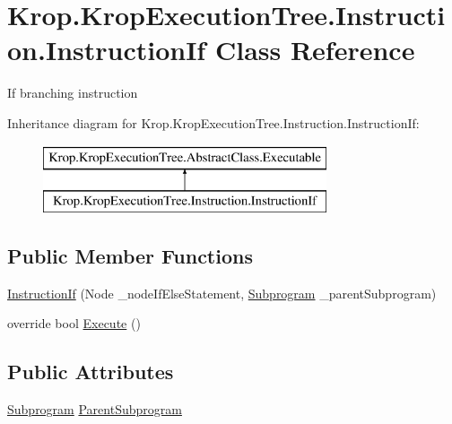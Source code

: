 \hypertarget{class_krop_1_1_krop_execution_tree_1_1_instruction_1_1_instruction_if}{}\section{Krop.\+Krop\+Execution\+Tree.\+Instruction.\+Instruction\+If Class Reference}
\label{class_krop_1_1_krop_execution_tree_1_1_instruction_1_1_instruction_if}


If branching instruction  


Inheritance diagram for Krop.\+Krop\+Execution\+Tree.\+Instruction.\+Instruction\+If\+:\begin{figure}[H]
\begin{center}
\leavevmode
\includegraphics[height=2.000000cm]{class_krop_1_1_krop_execution_tree_1_1_instruction_1_1_instruction_if}
\end{center}
\end{figure}
\subsection*{Public Member Functions}
\begin{DoxyCompactItemize}
\item 
\mbox{\hyperlink{class_krop_1_1_krop_execution_tree_1_1_instruction_1_1_instruction_if_aa1e6065bcdd27ee97b616878b08ad745}{Instruction\+If}} (Node \+\_\+node\+If\+Else\+Statement, \mbox{\hyperlink{class_krop_1_1_krop_execution_tree_1_1_subprogram}{Subprogram}} \+\_\+parent\+Subprogram)
\item 
override bool \mbox{\hyperlink{class_krop_1_1_krop_execution_tree_1_1_instruction_1_1_instruction_if_a69ee340a90824643f703e28e2ab665a1}{Execute}} ()
\end{DoxyCompactItemize}
\subsection*{Public Attributes}
\begin{DoxyCompactItemize}
\item 
\mbox{\hyperlink{class_krop_1_1_krop_execution_tree_1_1_subprogram}{Subprogram}} \mbox{\hyperlink{class_krop_1_1_krop_execution_tree_1_1_instruction_1_1_instruction_if_ac302196115aed8fe5c9f79cb6a6d7747}{Parent\+Subprogram}}
\end{DoxyCompactItemize}


